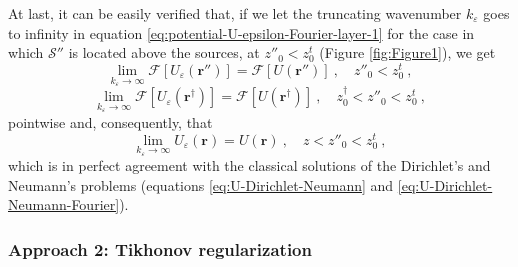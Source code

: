 \documentclass[manuscript,noblind]{geophysics}
\begin{document}
	At last, it can be easily verified that, if we let the truncating wavenumber $k_{\varepsilon}$ 
	goes to infinity in equation \ref{eq:potential-U-epsilon-Fourier-layer-1} for the case in which 
	$\mathcal{S}''$ is located above the sources, at $z''_{0} < z^{t}_{0}$ (Figure \ref{fig:Figure1}), 
	we get 
	\begin{equation}
		\lim_{k_{\varepsilon}\to\infty} \mathcal{F} \left[ U_{\varepsilon}(\mathbf{r}'') \right] = 
		\mathcal{F} \left[ U(\mathbf{r}'') \right] \: , \quad z''_{0} < z^{t}_{0} \: ,
		\label{eq:lim-kepsilon-potential-U-epsilon-Fourier-layer}
	\end{equation}
	\begin{equation}
		\lim_{k_{\varepsilon}\to\infty} \mathcal{F} \left[ U_{\varepsilon}(\mathbf{r}^{\dagger}) \right] = 
		\mathcal{F} \left[ U(\mathbf{r}^{\dagger}) \right] \: , \quad z^{\dagger}_{0} < z''_{0} < z^{t}_{0} \: ,
		\label{eq:lim-kepsilon-potential-U-epsilon-Fourier-dagger}
	\end{equation}
	pointwise and, consequently, that
	\begin{equation}
		\lim_{k_{\varepsilon}\to\infty} U_{\varepsilon}(\mathbf{r}) = 
		U(\mathbf{r}) \: , \quad z < z''_{0} < z^{t}_{0} \: ,
		\label{eq:lim-kepsilon-potential-U-epsilon-space}
	\end{equation}
	which is in perfect agreement with the classical solutions of the Dirichlet's and Neumann's
	problems (equations \ref{eq:U-Dirichlet-Neumann} and \ref{eq:U-Dirichlet-Neumann-Fourier}).
	
	\subsubsection{Approach 2: Tikhonov regularization}
	
\end{document}
